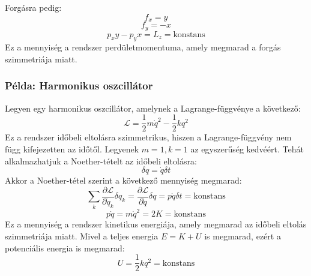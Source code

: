\documentclass[../main.tex]{subfiles}
\begin{document}
Forgásra pedig:
\begin{equation}
    f_x = y
\end{equation}
\begin{equation}
    f_y = -x
\end{equation}
\begin{equation}
    p_x y - p_y x = L_z = \text{konstans}
\end{equation}
Ez a mennyiség a rendszer perdületmomentuma, amely megmarad a forgás szimmetriája miatt.

\subsubsection*{Példa: Harmonikus oszcillátor}
Legyen egy harmonikus oszcillátor, amelynek a Lagrange-függvénye a következő:
\begin{equation}
    \mathcal{L} = \frac{1}{2}m \dot{q}^2 - \frac{1}{2}k q^2
\end{equation}
Ez a rendszer időbeli eltolásra szimmetrikus, hiszen a Lagrange-függvény nem függ kifejezetten az időtől. Legyenek $m = 1, k=1$ az egyszerűség kedvéért. Tehát alkalmazhatjuk a Noether-tételt az időbeli eltolásra:
\begin{equation}
    \delta q = \dot{q} \delta t
\end{equation}
Akkor a Noether-tétel szerint a következő mennyiség megmarad:
\begin{equation}
    \sum_k \frac{\partial \mathcal{L}}{\partial \dot{q}_k} \delta q_k = \frac{\partial \mathcal{L}}{\partial \dot{q}} \delta q = p \dot{q} \delta t = \text{konstans}
\end{equation}
\begin{equation}
    p \dot{q} = m \dot{q}^2 = 2K = \text{konstans}
\end{equation}
Ez a mennyiség a rendszer kinetikus energiája, amely megmarad az időbeli eltolás szimmetriája miatt. Mivel a teljes energia $E = K + U$ is megmarad, ezért a potenciális energia is megmarad:
\begin{equation}
    U = \frac{1}{2}k q^2 = \text{konstans}
\end{equation}
\end{document}
